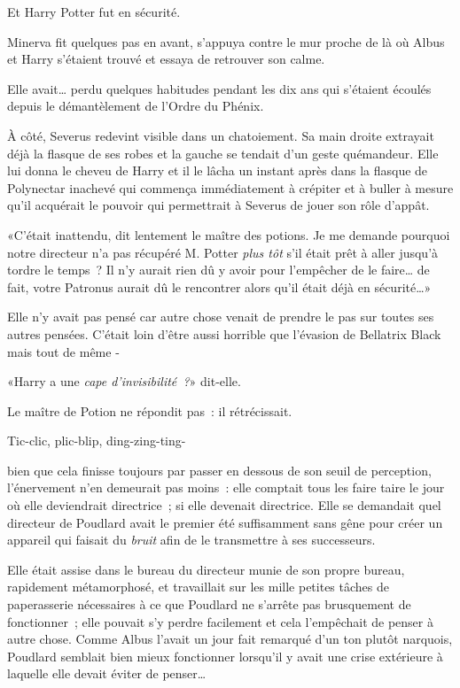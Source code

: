 Et Harry Potter fut en sécurité.

Minerva fit quelques pas en avant, s'appuya contre le mur proche de là où Albus et Harry s'étaient trouvé et essaya de retrouver son calme.

Elle avait… perdu quelques habitudes pendant les dix ans qui s'étaient écoulés depuis le démantèlement de l'Ordre du Phénix.

À côté, Severus redevint visible dans un chatoiement. Sa main droite extrayait déjà la flasque de ses robes et la gauche se tendait d'un geste quémandeur. Elle lui donna le cheveu de Harry et il le lâcha un instant après dans la flasque de Polynectar inachevé qui commença immédiatement à crépiter et à buller à mesure qu'il acquérait le pouvoir qui permettrait à Severus de jouer son rôle d'appât.

«C'était inattendu, dit lentement le maître des potions. Je me demande pourquoi notre directeur n'a pas récupéré M. Potter \emph{plus tôt} s'il était prêt à aller jusqu'à tordre le temps~? Il n'y aurait rien dû y avoir pour l'empêcher de le faire… de fait, votre Patronus aurait dû le rencontrer alors qu'il était déjà en sécurité…»

Elle n'y avait pas pensé car autre chose venait de prendre le pas sur toutes ses autres pensées. C'était loin d'être aussi horrible que l'évasion de Bellatrix Black mais tout de même -

«Harry a une \emph{cape d'invisibilité~?}» dit-elle.

Le maître de Potion ne répondit pas~: il rétrécissait.

\later

Tic-clic, plic-blip, ding-zing-ting-

bien que cela finisse toujours par passer en dessous de son seuil de perception, l'énervement n'en demeurait pas moins~: elle comptait tous les faire taire le jour où elle deviendrait directrice~; si elle devenait directrice. Elle se demandait quel directeur de Poudlard avait le premier été suffisamment sans gêne pour créer un appareil qui faisait du \emph{bruit} afin de le transmettre à ses successeurs.

Elle était assise dans le bureau du directeur munie de son propre bureau, rapidement métamorphosé, et travaillait sur les mille petites tâches de paperasserie nécessaires à ce que Poudlard ne s'arrête pas brusquement de fonctionner~; elle pouvait s'y perdre facilement et cela l'empêchait de penser à autre chose. Comme Albus l'avait un jour fait remarqué d'un ton plutôt narquois, Poudlard semblait bien mieux fonctionner lorsqu'il y avait une crise extérieure à laquelle elle devait éviter de penser…

